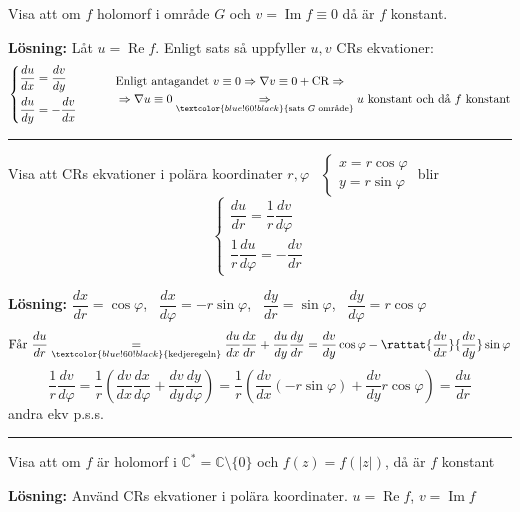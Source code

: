  \quad Visa att om $f$ holomorf i område $G$ och $v = \operatorname{Im} f \equiv 0$ då är $f$ konstant.

\textbf{Lösning:} Låt $u = \operatorname{Re} f$. Enligt sats så uppfyller $u, v$ CRs ekvationer:
\[ \begin{cases} \dfrac{du}{dx} = \dfrac{dv}{dy} \\[2ex] \dfrac{du}{dy} = -\dfrac{dv}{dx} \end{cases} \qquad
\begin{aligned}
  &\text{Enligt antagandet } v \equiv 0 \Rightarrow \nabla v \equiv 0 + \text{CR} \Rightarrow \\
  &\Rightarrow \nabla u \equiv 0 \underset{\textcolor{blue!60!black}{\text{sats } G \text{ område}}}{\Rightarrow} u \text{ konstant och då } f \text{ konstant}
\end{aligned} \]

\noindent\rule{\linewidth}{0.4pt}

 \quad Visa att CRs ekvationer i polära koordinater $r, \varphi$ \ $\begin{cases} x = r\cos\varphi \\ y = r\sin\varphi \end{cases}$ blir
\[ \begin{cases} \dfrac{du}{dr} = \dfrac{1}{r} \dfrac{dv}{d\varphi} \\[2ex] \dfrac{1}{r} \dfrac{du}{d\varphi} = -\dfrac{dv}{dr} \end{cases} \]

\textbf{Lösning:} $\dfrac{dx}{dr} = \cos\varphi$, \ $\dfrac{dx}{d\varphi} = -r\sin\varphi$, \ $\dfrac{dy}{dr} = \sin\varphi$, \ $\dfrac{dy}{d\varphi} = r\cos\varphi$
\[ \text{Får } \frac{du}{dr} \underset{\textcolor{blue!60!black}{\text{kedjeregeln}}}{=} \frac{du}{dx}\frac{dx}{dr} + \frac{du}{dy}\frac{dy}{dr} = \frac{dv}{dy}\cos\varphi - \rattat{\frac{dv}{dx}}{\frac{dv}{dy}}\sin\varphi \]
\[ \frac{1}{r}\frac{dv}{d\varphi} = \frac{1}{r}\left( \frac{dv}{dx}\frac{dx}{d\varphi} + \frac{dv}{dy}\frac{dy}{d\varphi} \right) = \frac{1}{r}\left( \frac{dv}{dx}(-r\sin\varphi) + \frac{dv}{dy} r\cos\varphi \right) = \frac{du}{dr} \]
andra ekv p.s.s.

\noindent\rule{\linewidth}{0.4pt}

 \quad Visa att om $f$ är holomorf i $\mathbb{C}^* = \mathbb{C} \setminus \{0\}$ och $f(z) = f(|z|)$, då är $f$ konstant

\textbf{Lösning:} Använd CRs ekvationer i polära koordinater. $u = \operatorname{Re} f$, $v = \operatorname{Im} f$

